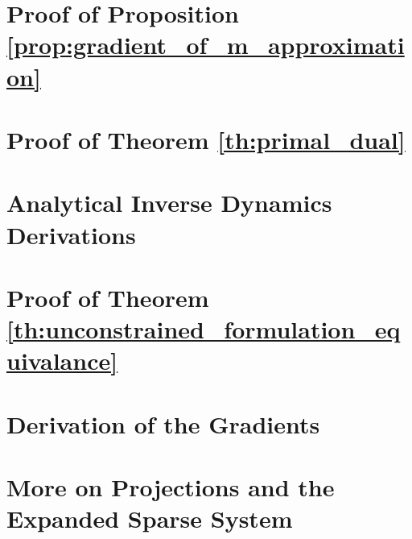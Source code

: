 \section{Proof of Proposition \ref{prop:gradient_of_m_approximation}}
\label{app:gradient_of_m_approximation}


\section{Proof of Theorem \ref{th:primal_dual}}
\label{app:primal_dual_proof}


\section{Analytical Inverse Dynamics Derivations}
\label{app:analytical_inverse_dynamics_derivations}


\section{Proof of Theorem \ref{th:unconstrained_formulation_equivalance}}
\label{app:unconstrained_formulation_equivalance}


\section{Derivation of the Gradients}
\label{app:gradients_derivation}


\section{More on Projections and the Expanded Sparse System}
\label{app:more_on_projections}

